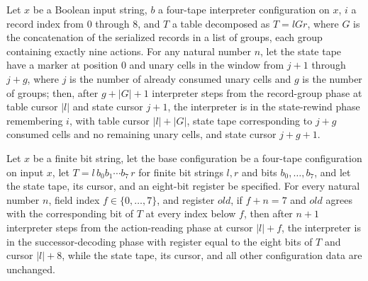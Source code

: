 \begin{lemma}
\label{Turing.universal_skip_groups}
\leanok
{}
Let $x$ be a Boolean input string, $b$ a four-tape interpreter configuration on $x$, $i$
a record index from $0$ through $8$, and $T$ a table decomposed as $T=lGr$, where $G$ is
the concatenation of the serialized records in a list of groups, each group containing
exactly nine actions. For any natural number $n$, let the state tape have a marker at
position $0$ and unary cells in the window from $j+1$ through $j+g$, where $j$ is the
number of already consumed unary cells and $g$ is the number of groups; then, after
$g+|G|+1$ interpreter steps from the record-group phase at table cursor $|l|$ and state
cursor $j+1$, the interpreter is in the state-rewind phase remembering $i$, with table
cursor $|l|+|G|$, state tape corresponding to $j+g$ consumed cells and no remaining
unary cells, and state cursor $j+g+1$.
\end{lemma}

\begin{lemma}
\label{Turing.universal_read_fixed}
\leanok
{}
Let $x$ be a finite bit string, let the base configuration be a four-tape configuration
on input $x$, let $T=l\,b_0b_1\cdots b_7\,r$ for finite bit strings $l,r$ and bits
$b_0,\ldots,b_7$, and let the state tape, its cursor, and an eight-bit register be
specified. For every natural number $n$, field index $f\in\{0,\ldots,7\}$, and register
$old$, if $f+n=7$ and $old$ agrees with the corresponding bit of $T$ at every index
below $f$, then after $n+1$ interpreter steps from the action-reading phase at cursor
$|l|+f$, the interpreter is in the successor-decoding phase with register equal to the
eight bits of $T$ and cursor $|l|+8$, while the state tape, its cursor, and all other
configuration data are unchanged.
\end{lemma}

